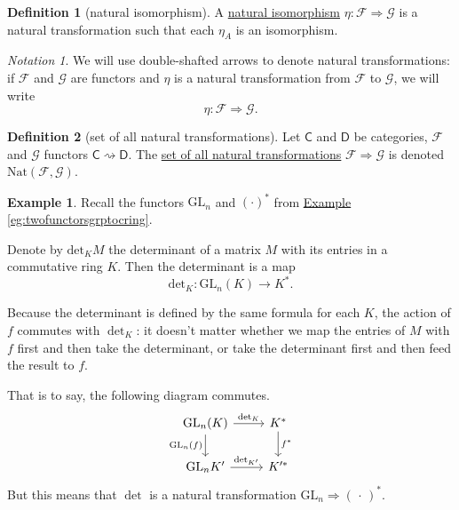 \documentclass[a4paper,10pt]{scrreprt}
\newcommand{\defn}[1]{\ul{#1}}
\newcommand{\GL}{\mathrm{GL}}
\newcommand{\Nat}{\mathrm{Nat}}
\theoremstyle{definition}
\newtheorem{definition}{Definition}[section]
\newtheorem{example}{Example}[section]
\theoremstyle{plain}
\theoremstyle{remark}
\newtheorem{notation}{Notation}[section]
\begin{document}
\begin{definition}[natural isomorphism]
  \label{def:naturalisomorphism}
  A \defn{natural isomorphism} $\eta\colon \mathcal{F} \Rightarrow \mathcal{G}$ is a natural transformation such that each $\eta_{A}$ is an isomorphism.
\end{definition}


\begin{notation}
  We will use double-shafted arrows to denote natural transformations: if $\mathcal{F}$ and $\mathcal{G}$ are functors and $\eta$ is a natural transformation from $\mathcal{F}$ to $\mathcal{G}$, we will write
  \begin{equation*}
    \eta\colon \mathcal{F} \Rightarrow \mathcal{G}.
  \end{equation*}
\end{notation}

\begin{definition}[set of all natural transformations]
  \label{def:setofallnaturaltransformations}
  Let $\mathsf{C}$ and $\mathsf{D}$ be categories, $\mathcal{F}$ and $\mathcal{G}$ functors $\mathsf{C} \rightsquigarrow \mathsf{D}$. The \defn{set of all natural transformations} $\mathcal{F} \Rightarrow \mathcal{G}$ is denoted $\Nat(\mathcal{F}, \mathcal{G})$.
\end{definition} 

\begin{example}
  Recall the functors $\mathrm{GL}_{n}$ and $(\cdot)^{*}$ from \hyperref[eg:twofunctorsgrptocring]{Example \ref*{eg:twofunctorsgrptocring}}.

  Denote by $\mathrm{det}_{K}M$ the determinant of a matrix $M$ with its entries in a commutative ring $K$. Then the determinant is a map
  \begin{equation*}
    \mathrm{det}_{K}\colon \GL_{n}(K) \to K^{*}.
  \end{equation*}

  Because the determinant is defined by the same formula for each $K$, the action of $f$ commutes with $\det_{K}$: it doesn't matter whether we map the entries of $M$ with $f$ first and then take the determinant, or take the determinant first and then feed the result to $f$.

  That is to say, the following diagram commutes.
  \begin{equation*}
    \begin{tikzcd}
      \GL_{n}(K)
      \arrow[r, "\det_{K}"]
      \arrow[d, swap, "\GL_{n}(f)"]
      & K^{*}
      \arrow[d, "f^{*}"]
      \\
      \GL_{n}K'
      \arrow[r, "\det_{K'}"]
      & K'^{*}
    \end{tikzcd}
  \end{equation*}
  But this means that $\det$ is a natural transformation $\GL_{n} \Rightarrow \mathrm{(\,\cdot\,)^{*}}$.
\end{example}
\end{document}
